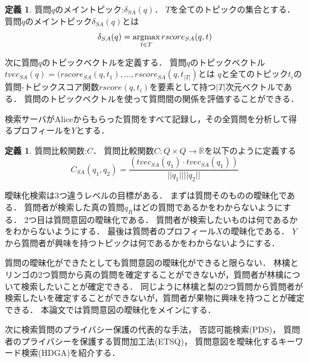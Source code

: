\documentclass[master]{suribt}
\theoremstyle{definition}
\newtheorem{defi}[thm]{定義}
\newcommand{\argmax}{\mathop{\rm argmax}\limits}
\begin{document}
 \begin{defi}{質問$q$のメイントピック:$\delta_{SA}(q)$．}
  $T$を全てのトピックの集合とする．
  質問$q$のメイントピック$\delta_{SA}(q)$とは
  \begin{equation}
   \delta_{SA}(q) = \argmax_{t \in T} rscore_{SA}(q,t)
  \end{equation}
 \end{defi}

 次に質問$q$のトピックベクトルを定義する．
 質問$q$のトピックベクトル$tvec_{SA}(q) = (rscore_{SA}(q,t_1 ), \dots , rscore_{SA}(q,t_{|T|})$とは
 $q$と全てのトピック$t_i$の質問-トピックスコア関数$rscore(q, t_i)$を要素として持つ$|T|$次元ベクトルである．
 質問のトピックベクトルを使って質問間の関係を評価することができる．

 検索サーバがAliceからもらった質問をすべて記録し，その全質問を分析して得るプロフィールを$Y$とする．

 \begin{defi}{質問比較関数:$C$．}
  質問比較関数$C:Q \times Q \rightarrow \mathbb{R}$を以下のように定義する
  \begin{equation}
  C_{SA}(q_1,q_2) = \frac{(tvec_{SA}(q_1) \cdot tvec_{SA}(q_1))}{||q_1|| ||q_2||}
  \end{equation}
 \end{defi}
 
 
 曖昧化検索は3つ違うレベルの目標がある．
 まずは質問そのものの曖昧化である．
 質問者が検索した真の質問$q_R$はどの質問であるかをわからないようにする．
 2つ目は質問意図の曖昧化である．
 質問者が検索したいものは何であるかをわからないようにする．
 最後は質問者のプロフィール$X$の曖昧化である．
 $Y$から質問者が興味を持つトピックは何であるかをわからないようにする．
 
 質問の曖昧化ができたとしても質問意図の曖昧化ができると限らない．
 {林檎}と{リンゴ}の2つ質問から真の質問を確定することができないが，質問者が林檎について検索したいことが確定できる．
 同じように{林檎}と{梨}の2つ質問から質問者が検索したいを確定することができないが，質問者が果物に興味を持つことが確定できる．
 本論文では質問意図の曖昧化をメインにする．

 次に検索質問のプライバシー保護の代表的な手法，
 否認可能検索(PDS)\cite{providing2009}，
 質問者のプライバシーを保護する質問加工法(ETSQ)\cite{embellishing2010}，
 質問意図を曖昧化するキーワード検索(HDGA)\cite{masking2014}を紹介する．
 
\end{document}
